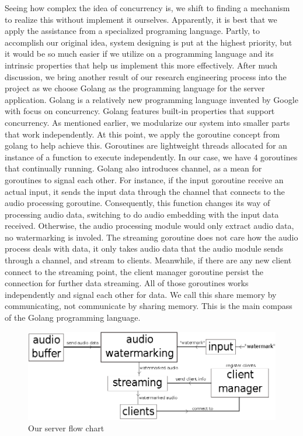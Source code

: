 Seeing how complex the idea of concurrency is, we shift to finding a mechanism to realize this without implement it ourselves. Apparently, it is best that we apply the assistance from a specialized programing language. Partly, to accomplish our original idea, system designing is put at the highest priority, but it would be so much easier if we utilize on a programming language and its intrinsic properties that help us implement this more effectively. After much discussion, we bring another result of our research engineering process into the project as we choose Golang as the programming language for the server application. Golang is a relatively new programming language invented by Google with focus on concurrency. Golang features built-in properties that support concurrency. As mentioned earlier, we modularize our system into smaller parts that work independently. At this point, we apply the goroutine concept from golang to help achieve this. Goroutines are lightweight threads allocated for an instance of a function to execute independently. In our case, we have 4 goroutines that continually running. Golang also introduces channel, as a mean for goroutines to signal each other. For instance, if the input goroutine receive an actual input, it sends the input data through the channel that connects to the audio processing goroutine. Consequently, this function changes its way of processing audio data, switching to do audio embedding with the input data received. Otherwise, the audio processing module would only extract audio data, no watermarking is involed. The streaming goroutine does not care how the audio process deals with data, it only takes audio data that the audio module sends through a channel, and stream to clients. Meanwhile, if there are any new client connect to the streaming point, the client manager goroutine persist the connection for further data streaming. All of those goroutines works independently and signal each other for data. We call this share memory by communicating, not communicate by sharing memory. This is the main compass of the Golang programming language.

\begin{figure}[bt]
\center
\includegraphics[width=.9\columnwidth]{system.eps}
\caption{Our server flow chart}
\label{fig:Server}
\end{figure}

